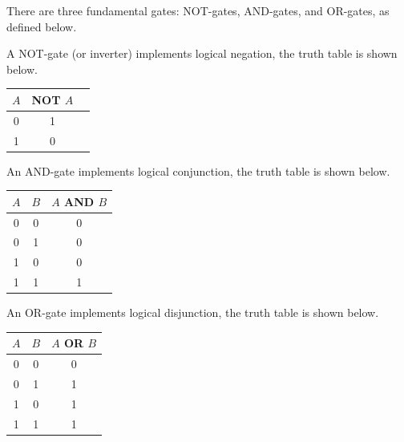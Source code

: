 There are three fundamental gates: NOT-gates, AND-gates, and OR-gates, as defined below.

\begin{definition}
    A NOT-gate (or inverter) implements logical negation, the truth table is shown below.
    \begin{center}
        \begin{tabular}{ccc}
                \toprule
                $A$ & NOT $A$ \\
                \midrule
                0 & 1 \\ 
                1 & 0 \\
                \bottomrule
        \end{tabular}
    \end{center}
\end{definition}

\begin{definition}
    An AND-gate implements logical conjunction, the truth table is shown below.
    \begin{center}
        \begin{tabular}{ccc}
                \toprule
                $A$ & $B$ & $A$ AND $B$ \\
                \midrule
                0 & 0 & 0 \\ 
                0 & 1 & 0 \\ 
                1 & 0 & 0 \\ 
                1 & 1 & 1 \\
                \bottomrule
        \end{tabular}
    \end{center}
\end{definition}

\begin{definition}[OR-gate]
    An OR-gate implements logical disjunction, the truth table is shown below.
    \begin{center}
        \begin{tabular}{ccc}
                \toprule
                $A$ & $B$ & $A$ OR $B$ \\
                \midrule
                0 & 0 & 0 \\ 
                0 & 1 & 1 \\ 
                1 & 0 & 1 \\ 
                1 & 1 & 1 \\
                \bottomrule
        \end{tabular}
    \end{center}
\end{definition}

